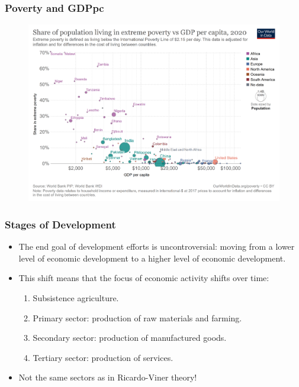 \documentclass{beamer}
\begin{document}
\begin{frame} 
	\frametitle{\LARGE{Poverty and GDPpc}}
	\begin{figure}[ht!]
		\centering
		\includegraphics[height=\textheight, keepaspectratio]{poverty_vs_gdppc.png}
	\end{figure}
\end{frame}

\begin{frame} 
\frametitle{\LARGE{Stages of Development}}
\begin{itemize}
	\item The end goal of development efforts is uncontroversial: moving from a lower level of economic development to a higher level of economic development. \pause
	\item This shift means that the focus of economic activity shifts over time: 
	\begin{enumerate}
		\item Subsistence agriculture. \pause
		\item Primary sector: production of raw materials and farming. \pause
		\item Secondary sector: production of manufactured goods. \pause
		\item Tertiary sector: production of services. \pause
	\end{enumerate}
	\item Not the same sectors as in Ricardo-Viner theory!
\end{itemize}
\end{frame}
\end{document}
